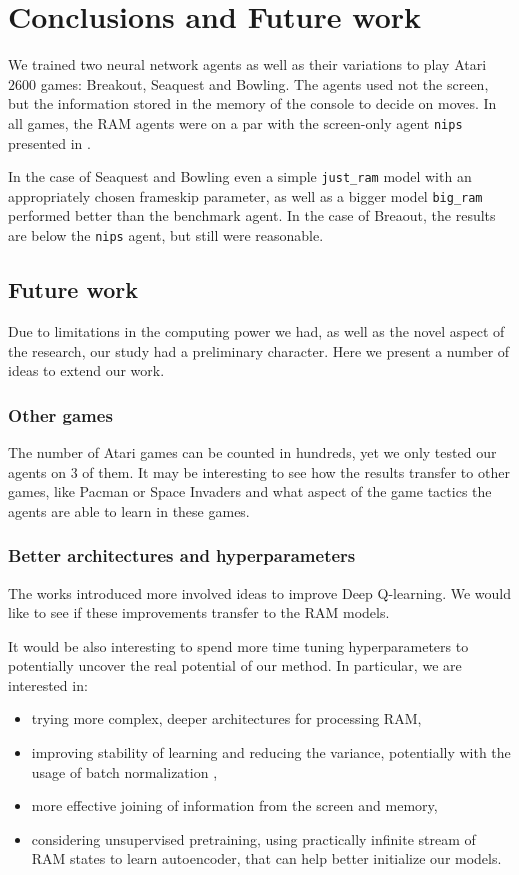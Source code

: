 \chapter{Conclusions and Future work}\label{conclusions}
We trained two neural network agents as well as their variations to play Atari $2600$ games: Breakout, Seaquest and Bowling. The agents used not the screen, but the information stored in the memory of the console to decide on moves. In all games, the RAM agents were on a par with the screen-only agent \texttt{nips} presented in \cite{nips-dqn}.

In the case of Seaquest and Bowling even a simple \texttt{just\_ram} model with an appropriately chosen frameskip parameter, as well as a bigger model \texttt{big\_ram} performed better than the benchmark agent. In the case of Breaout, the results are below the \texttt{nips} agent, but still were reasonable.

\section{Future work}
Due to limitations in the computing power we had, as well as the novel aspect of the research, our study had a preliminary character. Here we present a number of ideas to extend our work.

\subsection{Other games}
The number of Atari games can be counted in hundreds, yet we only tested our agents on $3$ of them. It may be interesting to see how the results transfer to other games, like Pacman or Space Invaders and what aspect of the game tactics the agents are able to learn in these games.

\subsection{Better architectures and hyperparameters}
The works \cite{nature-dqn, double-dqn, shallow-dqn, duelling-dqn} introduced more 
involved ideas to improve Deep Q-learning. We would like to see if these improvements transfer to the RAM models.

It would be also interesting to spend more time tuning hyperparameters to potentially uncover the real potential of our method. In particular, we are interested in:
\begin{itemize}
  \item trying more complex, deeper architectures for processing RAM,
  \item improving stability of learning and reducing the variance, potentially with the usage of batch normalization \cite{batchnorm},
  \item more effective joining of information from the screen and memory,
  \item considering unsupervised pretraining, using practically infinite stream of RAM states to learn autoencoder, that can help better initialize our models.
\end{itemize}

